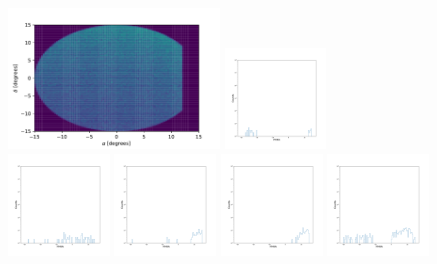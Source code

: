 \documentclass[12pt,prd]{article}
\begin{document}
\begin{figure}[h!]
\centering
\includegraphics[width=0.5\textwidth]{../figures/histogram2dgaiascan_l101_2_b58_4_ra212_7_dec55_2_npy.pdf}
\includegraphics[width=0.24\textwidth]{../figures/stars_passing_cut_rahistgaiascan_l101_2_b58_4_ra212_7_dec55_2_npy_0.pdf}
\includegraphics[width=0.24\textwidth]{../figures/stars_passing_cut_rahistgaiascan_l101_2_b58_4_ra212_7_dec55_2_npy_1.pdf}
\includegraphics[width=0.24\textwidth]{../figures/stars_passing_cut_rahistgaiascan_l101_2_b58_4_ra212_7_dec55_2_npy_2.pdf}
\includegraphics[width=0.24\textwidth]{../figures/stars_passing_cut_rahistgaiascan_l101_2_b58_4_ra212_7_dec55_2_npy_3.pdf}
\includegraphics[width=0.24\textwidth]{../figures/stars_passing_cut_rahistgaiascan_l101_2_b58_4_ra212_7_dec55_2_npy_4.pdf}

\end{figure}
\end{document}
